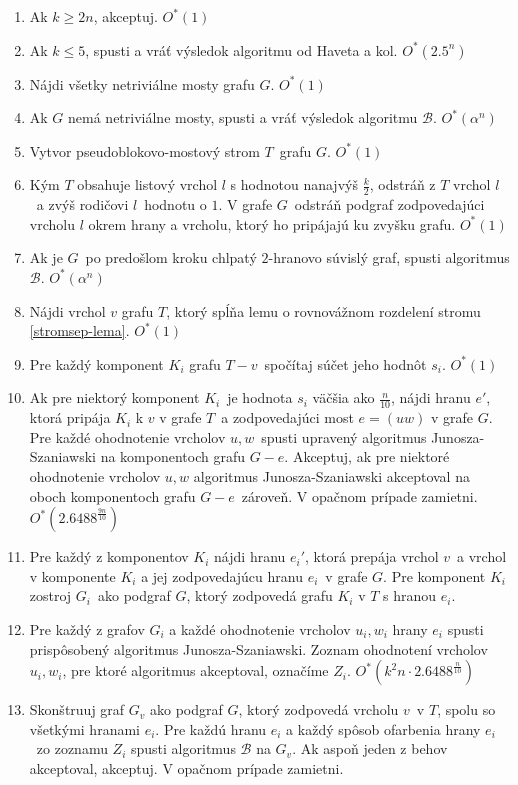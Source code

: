 \begin{enumerate}
    \item Ak $k \ge 2n$, akceptuj. $O^*(1)$
    \item Ak $k \leq 5$, spusti a vráť výsledok algoritmu od Haveta a kol. $O^*(2.5^n)$
    \item Nájdi všetky netriviálne mosty grafu $G$. $O^*(1)$
    \item Ak $G$ nemá netriviálne mosty, spusti a vráť výsledok algoritmu $\mathcal{B}$. $O^*(\alpha^n)$
    \item Vytvor pseudoblokovo-mostový strom $T$ grafu $G$. $O^*(1)$
    \item Kým $T$ obsahuje listový vrchol $l$ s hodnotou nanajvýš $\frac{k}{2}$, odstráň
          z $T$ vrchol $l$ a zvýš rodičovi $l$ hodnotu o $1$. V grafe $G$ odstráň podgraf
          zodpovedajúci vrcholu $l$ okrem hrany a vrcholu, ktorý ho pripájajú ku zvyšku grafu. $O^*(1)$
    \item Ak je $G$ po predošlom kroku chlpatý $2$-hranovo súvislý graf, spusti algoritmus $\mathcal{B}$. $O^*(\alpha^n)$
    \item Nájdi vrchol $v$ grafu $T$, ktorý
          spĺňa lemu o rovnovážnom rozdelení stromu \ref{stromsep-lema}. $O^*(1)$
    \item Pre každý komponent $K_i$ grafu $T - v$ spočítaj súčet jeho hodnôt $s_i$. $O^*(1)$
    \item Ak pre niektorý komponent $K_i$ je hodnota $s_i$ väčšia ako $\frac{n}{10}$,
          nájdi hranu $e'$, ktorá pripája $K_i$ k $v$ v grafe $T$ a zodpovedajúci most
          $e = (uw)$ v grafe $G$. Pre každé ohodnotenie vrcholov $u, w$ spusti upravený
          algoritmus Junosza-Szaniawski na komponentoch grafu $G - e$. Akceptuj, ak pre
          niektoré ohodnotenie vrcholov $u, w$ algoritmus Junosza-Szaniawski akceptoval
          na oboch komponentoch grafu $G-e$ zároveň. V opačnom prípade zamietni. $O^*(2.6488^{\frac{9n}{10}})$
    \item Pre každý z komponentov $K_i$ nájdi hranu $e_i'$, ktorá prepája vrchol $v$ a vrchol
          v komponente $K_i$ a jej zodpovedajúcu hranu $e_i$ v grafe $G$. Pre komponent $K_i$ zostroj
          $G_i$ ako podgraf $G$, ktorý zodpovedá grafu $K_i$ v $T$ s hranou $e_i$. 
    \item Pre každý z grafov $G_i$ a každé ohodnotenie vrcholov $u_i, w_i$ hrany $e_i$ spusti
          prispôsobený algoritmus Junosza-Szaniawski. Zoznam ohodnotení vrcholov $u_i, w_i$,
          pre ktoré algoritmus akceptoval, označíme $Z_i$. $O^*(k^2n \cdot 2.6488^{\frac{n}{10}})$
    \item Skonštruuj graf $G_v$ ako podgraf $G$, ktorý zodpovedá vrcholu $v$ v $T$, spolu so
          všetkými hranami $e_i$. Pre každú hranu $e_i$ a každý spôsob ofarbenia hrany $e_i$ zo zoznamu $Z_i$
          spusti algoritmus $\mathcal{B}$ na $G_v$. Ak aspoň jeden z behov akceptoval, akceptuj.
          V opačnom prípade zamietni.
\end{enumerate}


